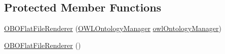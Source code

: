 \subsection*{Protected Member Functions}
\begin{DoxyCompactItemize}
\item 
\hyperlink{classorg_1_1coode_1_1owlapi_1_1obo_1_1renderer_1_1_o_b_o_flat_file_renderer_a99369d7d22bd4058bebbf8dc1db81e22}{O\-B\-O\-Flat\-File\-Renderer} (\hyperlink{interfaceorg_1_1semanticweb_1_1owlapi_1_1model_1_1_o_w_l_ontology_manager}{O\-W\-L\-Ontology\-Manager} \hyperlink{classorg_1_1semanticweb_1_1owlapi_1_1io_1_1_abstract_o_w_l_renderer_abb9888586f19a7a923cba542d99f1556}{owl\-Ontology\-Manager})
\item 
\hyperlink{classorg_1_1coode_1_1owlapi_1_1obo_1_1renderer_1_1_o_b_o_flat_file_renderer_a5be0e52abc96b4e8051194699b777def}{O\-B\-O\-Flat\-File\-Renderer} ()
\end{DoxyCompactItemize}
